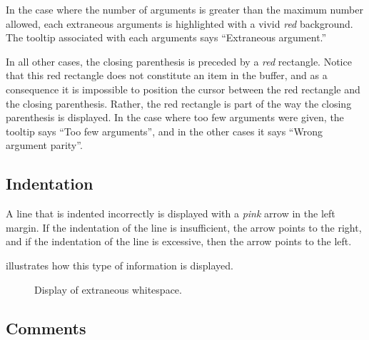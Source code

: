 In the case where the number of arguments is greater than the maximum
number allowed, each extraneous arguments is highlighted with a vivid
\emph{red} background.  The tooltip associated with each arguments
says ``Extraneous argument.'' 

In all other cases, the closing parenthesis is preceded by a
\emph{red} rectangle.  Notice that this red rectangle does not
constitute an item in the buffer, and as a consequence it is
impossible to position the cursor between the red rectangle and the
closing parenthesis.  Rather, the red rectangle is part of the way the
closing parenthesis is displayed.  In the case where too few arguments
were given, the tooltip says ``Too few arguments'', and in the other
cases it says ``Wrong argument parity''.

\subsection{Indentation}

A line that is indented incorrectly is displayed with a \emph{pink}
arrow in the left margin.  If the indentation of the line is
insufficient, the arrow points to the right, and if the indentation of
the line is excessive, then the arrow points to the left.

 illustrates how this type of
information is displayed.

\begin{figure}
\begin{center}
\end{center}
\caption{\label{fig-wrong-indentation}
Display of extraneous whitespace.}
\end{figure}

\subsection{Comments}

